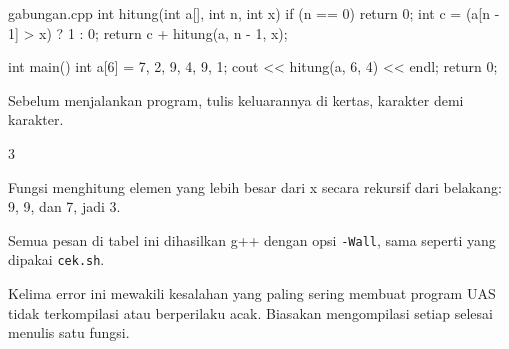 \documentclass[a4paper]{article}
\begin{document}
\begin{MKode}{gabungan.cpp}
int hitung(int a[], int n, int x) {
    if (n == 0) return 0;
    int c = (a[n - 1] > x) ? 1 : 0;
    return c + hitung(a, n - 1, x);
}

int main() {
    int a[6] = {7, 2, 9, 4, 9, 1};
    cout << hitung(a, 6, 4) << endl;
    return 0;
}
\end{MKode}
\begin{Tebak}[]
Sebelum menjalankan program, tulis keluarannya di kertas, karakter demi karakter.
\end{Tebak}
\begin{Jawaban}[]
\begin{MKeluaran}[]
3
\end{MKeluaran}
Fungsi menghitung elemen yang lebih besar dari x secara rekursif dari belakang: 9, 9, dan 7, jadi 3.
\end{Jawaban}
Semua pesan di tabel ini dihasilkan g++ dengan opsi \texttt{-Wall}, sama seperti yang dipakai \texttt{cek.sh}.
\par\vspace{4pt}\par\vspace{6pt}
Kelima error ini mewakili kesalahan yang paling sering membuat program UAS tidak terkompilasi atau berperilaku acak. Biasakan mengompilasi setiap selesai menulis satu fungsi.
\end{document}
